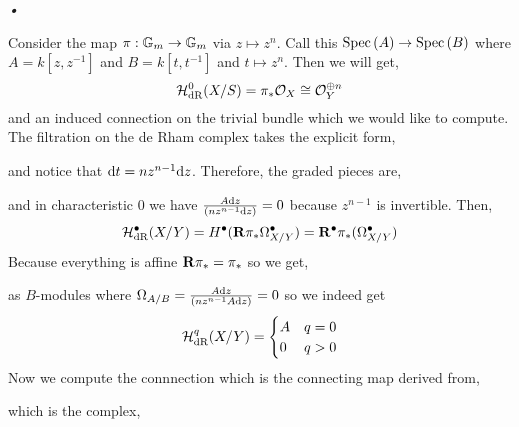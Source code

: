 \textit{•}\documentclass[12pt]{article}
\begin{document}
Consider the map $\pi : \mathbb{G}_m \to \mathbb{G}_m$ via $z \mapsto z^n$. Call this $\mathrm{Spec}\left( A \right) \to \mathrm{Spec}\left( B \right)$ where $A = k[z,z^{-1}]$ and $B = k[t,t^{-1}]$ and $t \mapsto z^n$. Then we will get,
\[ \mathcal{H}_{\mathrm{dR}}^0(X/S) = \pi_* \mathcal{O}_{X} \cong \mathcal{O}_{Y}^{\oplus n} \]
and an induced connection on the trivial bundle which we would like to compute. The filtration on the de Rham complex takes the explicit form,
\begin{center}
\end{center}
and notice that $\mathrm{d}{t} = n z^{n-1} \mathrm{d}{z}$. Therefore, the graded pieces are,
\begin{center}
\end{center}
and in characteristic $0$ we have $\frac{A \mathrm{d}{z}}{(n z^{n-1} \mathrm{d}{z})} = 0$ because $z^{n-1}$ is invertible. Then,
\[ \mathcal{H}_{\mathrm{dR}}^\bullet(X/Y) = H^\bullet(\mathbf{R} \pi_* \Omega^\bullet_{X/Y}) = \mathbf{R}^\bullet \pi_*(\Omega^\bullet_{X/Y}) \]
Because everything is affine $\mathbf{R} \pi_* = \pi_*$ so we get,
\begin{center}
\end{center}
as $B$-modules where $\Omega_{A/B} = \frac{A \mathrm{d}{z}}{(n z^{n-1} A \mathrm{d}{z})} = 0$ so we indeed get \[ \mathcal{H}_{\mathrm{dR}}^q(X/Y) = 
\begin{cases}
A & q = 0
\\
0 & q > 0
\end{cases} \] 
Now we compute the connnection which is the connecting map derived from,
\begin{center}
\end{center}
which is the complex,
\begin{center}
\end{center}
\end{document}
